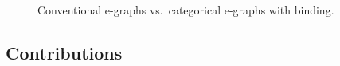 
\begin{figure}
	\captionsetup{skip=0pt}
	\begin{subfigure}{\linewidth}
		\label{fig:e-graph-substitution}
	\end{subfigure}
	\begin{subfigure}{\linewidth}
		\label{fig:e-string-substitution}
	\end{subfigure}
	\caption{Conventional e-graphs vs.\ categorical e-graphs with binding.}
\end{figure}

\subsection{Contributions}

